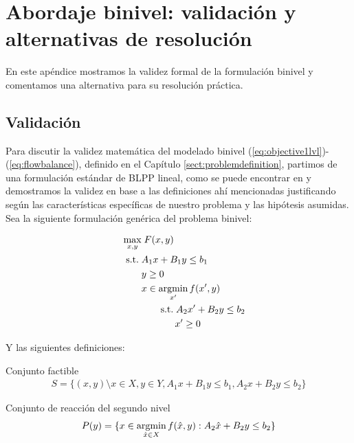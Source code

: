\chapter{Abordaje binivel: validación y alternativas de resolución}
\label{sect:apendixbilevel}

En este apéndice mostramos la validez formal de la formulación binivel y comentamos una alternativa para su resolución práctica.

\section{Validación}
\label{sect:apendixbilevelvalidation}

Para discutir la validez matemática del modelado binivel (\ref{eq:objective1lvl})-(\ref{eq:flowbalance}), definido en el Capítulo \ref{sect:problemdefinition}, partimos de una formulación estándar de BLPP lineal, como se puede encontrar en \textcite{bardbook} y demostramos la validez en base a las definiciones ahí mencionadas justificando según las características específicas de nuestro problema y las hipótesis asumidas. Sea la siguiente formulación genérica del problema binivel:

\begin{align}
\max_{x, y}               & \; F(x, y) \label{bilevelgeneric1} \\
\hspace{1.5em} \text{s.t.}\; & A_1 x + B_1 y \leq b_1 \\
                          & y \geq 0 \\
                          & x \in \mathop{\mathrm{argmin}}_{x'} f(x', y) \\
                          & \qquad \text{s.t.}\; A_2 x' + B_2 y \leq b_2 \label{bilevelgeneric5} \\
                          & \qquad \hspace{1.5em} x' \geq 0 \label{bilevelgeneric6}
\end{align}

\clearpage
Y las siguientes definiciones:

\begin{definition}
Conjunto factible
\begin{align}
  S = \{(x, y) \setminus x \in X, y \in Y, A_1 x + B_1 y \leq b_1, A_2 x + B_2 y \leq b_2 \}
\end{align}
\end{definition}

\begin{definition}
Conjunto de reacción del segundo nivel
\begin{align}
  P(y) = \{ x \in \mathop{\mathrm{argmin}}_{\hat{x} \in X} f(\hat{x}, y) : A_2 \hat{x} + B_2 y \leq b_2 \}
\end{align}
\end{definition}

